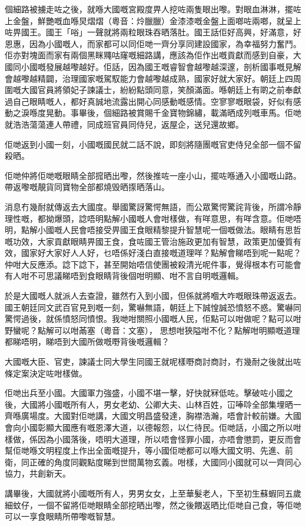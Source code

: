 個細路被擄走咗之後，就喺大國嘅宮殿度畀人挖咗兩隻眼出嚟。對眼血淋淋，擺咗上金盤，鮮艷嘅血喺炅熠熠（粵音：炩臘臘）金漆漆嘅金盤上面啷咗兩啷，就呈上咗畀國王。國王「唂」一聲就將兩粒眼珠吞晒落肚。國王話佢好高興，好滿意，好恩惠，因為小國嘅人，而家都可以同佢哋一齊分享同建設國家，為幸福努力奮鬥。佢亦對塊面而家有兩個黑眯鼆咕窿嘅細路講，應該為佢作出嘅貢獻而感到自豪，大國同小國嘅發展越嚟越好。佢話，因為國王嘅睿智會越嚟越深邃，剖析國事嘅見解會越嚟越精闢，治理國家嘅駕馭能力會越嚟越成熟，國家好就大家好。朝廷上四周圍嘅大國官員將領妃子諫議士，紛紛點頭同意，笑顏滿面。喺朝廷上有啲之前奉獻過自己眼睛嘅人，都好真誠地流露出開心同感動嘅感情。空寥寥嘅眼袋，好似有感動之淚喺度晃動。事畢後，個細路被賞賜千金寶物錦繡，載滿晒成列嘅車馬。佢哋就浩浩蕩蕩連人帶禮，同成班官員同侍兒，返屋企，送兒還故鄉。



佢哋返到小國一刻，小國嘅國民就二話不說，即刻將隨團嘅官吏侍兒全部一個不留殺晒。



佢哋仲將佢哋嘅眼睛全部搲晒出嚟，然後推咗一座小山，擺咗喺通入小國嘅山路。帶返嚟嘅靚貨同寶物全部都燒毁晒揼晒落山。



消息冇幾耐就傳返去大國度。舉國驚訝驚愕無語，而公眾驚愕驚詫背後，所謂冷靜理性嘅，都拗爆頭，諗唔明點解小國嘅人會咁樣做，有咩意思，有咩含意。佢哋唔明，點解小國嘅人民會唔接受畀國王食眼精黎提升智慧呢一個嘅做法。眼睛有思哲嘅功效，大家貢獻眼睛畀國王食，食咗國王管治施政更加有智慧，政策更加優質有效，國家好大家好人人好，乜唔係好淺白直接嘅道理咩？點解會睇唔到呢一點呢？仲咁大反應添。諗下諗下，甚至開始唔信使團被殺清光呢件事，覺得根本冇可能會有人咁不可思議睇唔到食眼睛背後個咁明顯、咁不言自明嘅邏輯。



於是大國嘅人就派人去查證，雖然冇入到小國，但係就將嗰大咋嘅眼珠帶返返去。國王朝廷同文武百官見到嘅一刻，驚嚇無語，朝廷上下誠惶誠恐憤怒不惑。驚嚇同驚愕過後，就係憤怒同憤恨。我哋咁關照小國嘅人民，佢點可以咁做呢？點可以咁野蠻呢？點解可以咁㒼塞（粵音：文塞）， 思想咁狹隘咁不化？點解咁明顯嘅道理都睇唔明，睇唔到大國所做嘅嘢背後嘅邏輯？



大國嘅大臣、官吏，諫議士同大學生同國王就呢樣嘢商討商討，冇幾耐之後就出咗條定案決定咗咁樣做。



佢哋出兵至小國。大國軍力強盛，小國不堪一擊，好快就冧低咗。擊破咗小國之後，大國將小國嘅所有人，男女老幼、公卿大夫、山林百姓，冚唪唥全部集埋晒一齊喺廣場度。大國對佢哋講，大國文明昌盛發達，胸襟浩瀚，唔會計較前嫌。大國會向小國彰顯大國應有嘅恩澤大道，以德報怨，以仁待民。佢哋話，小國之所以咁樣做，係因為小國落後，唔明大道理，所以唔會怪罪小國，亦唔會懲罰，更反而會幫佢哋喺文明程度上作出全面嘅提升，等小國佢哋都可以喺大國文明、先進、前衛，同正確的角度同觀點度睇到世間萬物玄義。咁樣，大國同小國就可以一齊同心協力，共創新天。



講畢後，大國就將小國嘅所有人，男男女女，上至華髮老人，下至初生蘇蝦同五歲細蚊仔，一個不留將佢哋眼睛全部挖晒出嚟，然之後餵返晒比佢哋自己食，等佢哋可以一享食眼睛所帶嚟嘅智慧。